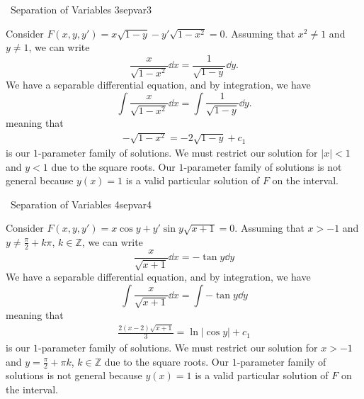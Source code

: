     \pagebreak
    \begin{example}{\Difficulty\,\Difficulty\,\,Separation of Variables 3}{sepvar3}

        Consider \(F(x,y,y')=x\sqrt{1-y}-y'\sqrt{1-x^2}=0\). Assuming that \(x^2\neq 1\) and \(y\neq 1\), we can write
        \begin{equation*}
            \frac{x}{\sqrt{1-x^2}}\dd x=\frac{1}{\sqrt{1-y}}\dd y.
        \end{equation*}
        We have a separable differential equation, and by integration, we have
        \begin{equation*}
            \int \frac{x}{\sqrt{1-x^2}}\dd x=\int \frac{1}{\sqrt{1-y}}\dd y.
        \end{equation*}
        meaning that
        \begin{align*}
            -\sqrt{1-x^2}=-2\sqrt{1-y}+c_1
        \end{align*}
        is our \(1\)-parameter family of solutions. We must restrict our solution for \(|x|<1\) and \(y<1\) due to the square roots. Our \(1\)-parameter family of solutions is not general because \(y(x)=1\) is a valid particular solution of \(F\) on the interval.
        
    \end{example}
    \begin{example}{\Difficulty\,\Difficulty\,\,Separation of Variables 4}{sepvar4}

        Consider \(F(x,y,y')=x\cos y+y'\sin y\sqrt{x+1}=0\). Assuming that \(x>-1\) and \(y\neq \frac{\pi}{2}+k\pi\), \(k\in\mathbb{Z}\), we can write
        \begin{equation*}
            \frac{x}{\sqrt{x+1}}\dd x=-\tan y \dd y
        \end{equation*}
        We have a separable differential equation, and by integration, we have
        \begin{equation*}
            \int \frac{x}{\sqrt{x+1}}\dd x=\int -\tan y \dd y
        \end{equation*}
        meaning that
        \begin{align*}
            \frac{2(x-2)\sqrt{x+1}}{3}=\ln|\cos y|+c_1
        \end{align*}
        is our \(1\)-parameter family of solutions. We must restrict our solution for \(x>-1\) and \(y=\frac{\pi}{2}+\pi k\), \(k\in\mathbb{Z}\) due to the square roots. Our \(1\)-parameter family of solutions is not general because \(y(x)=1\) is a valid particular solution of \(F\) on the interval.
        \DOTHISLATER

    \end{example}
    \pagebreak

